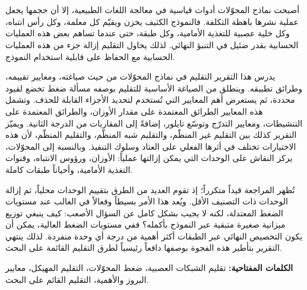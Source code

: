 	\chapter*{\ArabicSummaryHeading}
	\markboth{\ArabicSummaryHeading}{\ArabicSummaryHeading}
\else
	\begin{otherlanguage}{arabic}
	\chapter*{\ArabicSummaryHeading}
	\markboth{\ArabicSummaryHeading}{\ArabicSummaryHeading}

أصبحت نماذج المحوّلات أدوات قياسية في معالجة اللغات الطبيعية، إلا أن حجمها يجعل عملية نشرها باهظة التكلفة. فالنموذج الكثيف يخزن ويقيّم كل معلمة، وكل رأس انتباه، وكل خلية عصبية للتغذية الأمامية، وكل طبقة، حتى عندما تساهم بعض هذه العمليات الحسابية بقدر ضئيل في التنبؤ النهائي. لذلك يحاول التقليم إزالة جزء من هذه العمليات الحسابية مع الحفاظ على قابلية استخدام النموذج.

يدرس هذا التقرير التقليم في نماذج المحوّلات من حيث صياغته، ومعايير تقييمه، وطرائق تطبيقه. وينطلق من الصياغة الأساسية للتقليم بوصفه مسألة ضغط تخضع لقيود محددة، ثم يستعرض أهم المعايير التي تُستخدم لتحديد الأجزاء القابلة للحذف. وتشمل هذه المعايير الطرائق المعتمدة على مقدار الأوزان، والطرائق المعتمدة على التنشيطات، ومعايير التدرّج وتوسّع تايلور، إضافةً إلى المقاربات من الدرجة الثانية. ويميّز التقرير كذلك بين التقليم غير المنظّم، والتقليم شبه المنظّم، والتقليم المنظّم، لأن هذه الاختيارات تختلف في أثرها الفعلي على العتاد وسلوك التنفيذ. وبالنسبة إلى المحوّلات، يركز النقاش على الوحدات التي يمكن إزالتها عملياً: الأوزان، ورؤوس الانتباه، وقنوات التغذية الأمامية، وأحياناً طبقات كاملة.

تُظهر المراجعة قيداً متكرراً؛ إذ تقوم العديد من الطرق بتقييم الوحدات محلياً، ثم إزالة الوحدات ذات التصنيف الأقل. ويُعد هذا الأمر بسيطاً وفعالاً في الغالب عند مستويات الضغط المعتدلة، لكنه لا يجيب بشكل كامل عن السؤال الأصعب: كيف ينبغي توزيع ميزانية صغيرة متبقية عبر النموذج بأكمله؟ ففي مستويات الضغط العالية، يمكن أن يكون التخصيص النهائي عبر الطبقات أكثر أهمية من درجة أي وحدة منفردة. لذلك ينتهي التقرير بتأطير هذه الفجوة بوصفها دافعاً رئيسياً لطرق التقليم القائمة على البحث.

\vspace{1em}
\noindent\textbf{الكلمات المفتاحية:} تقليم الشبكات العصبية، ضغط المحوّلات، التقليم المهيكل، معايير البروز والأهمية، التقليم القائم على البحث.

	\end{otherlanguage}
\fi

\clearpage
